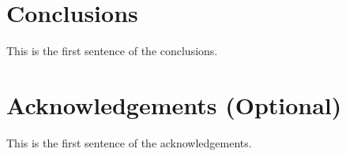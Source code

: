 \documentclass{paris17}
\begin{document}

\section{Conclusions}

This is the first sentence of the conclusions.

\section{Acknowledgements (Optional)}

This is the first sentence of the acknowledgements.



\end{document}
